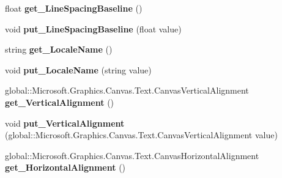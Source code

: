 \begin{DoxyCompactItemize}
float {\bfseries get\+\_\+\+Line\+Spacing\+Baseline} ()
\item 
\mbox{\label{class_microsoft_1_1_graphics_1_1_canvas_1_1_text_1_1_canvas_text_format_aec8fbb6fcced1fdc45e7edb73fec46f1}} 
void {\bfseries put\+\_\+\+Line\+Spacing\+Baseline} (float value)
\item 
\mbox{\label{class_microsoft_1_1_graphics_1_1_canvas_1_1_text_1_1_canvas_text_format_aab1272a9576fbc301b6645b050fc4938}} 
string {\bfseries get\+\_\+\+Locale\+Name} ()
\item 
\mbox{\label{class_microsoft_1_1_graphics_1_1_canvas_1_1_text_1_1_canvas_text_format_ad8facd01f087e75c6d8dde3e81ac836f}} 
void {\bfseries put\+\_\+\+Locale\+Name} (string value)
\item 
\mbox{\label{class_microsoft_1_1_graphics_1_1_canvas_1_1_text_1_1_canvas_text_format_a4400b8ea39646d7a48f76a32e6197d12}} 
global\+::\+Microsoft.\+Graphics.\+Canvas.\+Text.\+Canvas\+Vertical\+Alignment {\bfseries get\+\_\+\+Vertical\+Alignment} ()
\item 
\mbox{\label{class_microsoft_1_1_graphics_1_1_canvas_1_1_text_1_1_canvas_text_format_ad8c32a1802c2930e9a41b312f03881b1}} 
void {\bfseries put\+\_\+\+Vertical\+Alignment} (global\+::\+Microsoft.\+Graphics.\+Canvas.\+Text.\+Canvas\+Vertical\+Alignment value)
\item 
\mbox{\label{class_microsoft_1_1_graphics_1_1_canvas_1_1_text_1_1_canvas_text_format_aada5eeeefb336038b13a36fa1c2eafda}} 
global\+::\+Microsoft.\+Graphics.\+Canvas.\+Text.\+Canvas\+Horizontal\+Alignment {\bfseries get\+\_\+\+Horizontal\+Alignment} ()
\item 
\mbox{\label{class_microsoft_1_1_graphics_1_1_canvas_1_1_text_1_1_canvas_text_format_a41dba6b94d37a3688961e2aaf678a2e6}} 

\end{DoxyCompactItemize}
